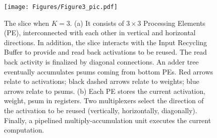 \begin{figure}
\texttt{[image: Figures/Figure3\_pic.pdf]}
\centering
\caption{The slice when $K=3$. (a) It consists of $3 \times 3$ Processing Elements (PE), interconnected with each other in vertical and horizontal directions. In addition, the slice interacts with the Input Recycling Buffer to provide and read back activations to be reused. The read back activity is finalized by diagonal connections. An adder tree eventually accumulates psums coming from bottom PEs. Red arrows relate to activations; black dashed arrows relate to weights; blue arrows relate to psums.
(b) Each PE stores the current activation, weight, psum in registers. Two multiplexers select the direction of the activation to be reused (vertically, horizontally, diagonally). Finally, a pipelined multiply-accumulation unit executes the current computation.
}
\label{SA_PE}
\end{figure}